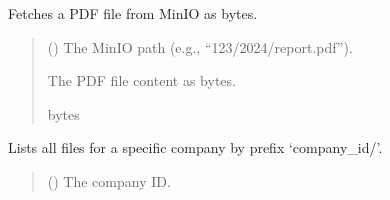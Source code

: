 \documentclass[letterpaper,10pt,english]{sphinxmanual}
\begin{document}
\begin{fulllineitems}
\begin{fulllineitems}
\begin{quote}
\begin{description}
\end{description}\end{quote}

\end{fulllineitems}


\begin{fulllineitems}
\label{\detokenize{src:src.db_utils.minio.MinioFileSystem.get_pdf_bytes}}
\pysigstartsignatures
{}
\pysigstopsignatures
\sphinxAtStartPar
Fetches a PDF file from MinIO as bytes.
\begin{quote}\begin{description}
\sphinxAtStartPar
{} () \textendash{} The MinIO path (e.g., “123/2024/report.pdf”).

\sphinxAtStartPar
The PDF file content as bytes.

\sphinxAtStartPar
bytes

\end{description}\end{quote}

\end{fulllineitems}


\begin{fulllineitems}
\label{\detokenize{src:src.db_utils.minio.MinioFileSystem.list_files_by_company}}
\pysigstartsignatures
{}
\pysigstopsignatures
\sphinxAtStartPar
Lists all files for a specific company by prefix ‘company\_id/’.
\begin{quote}\begin{description}
\sphinxAtStartPar
{} () \textendash{} The company ID.


\end{description}
\end{quote}
\end{fulllineitems}
\end{fulllineitems}
\end{document}
